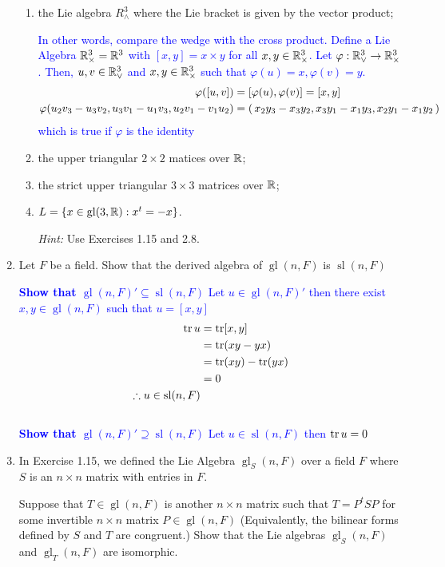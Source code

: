 \documentclass[12pt,a4paper]{report}
\newcommand{\BLUE}[1]{\textcolor{blue}{#1}}
\newcommand{\GL}{\operatorname{gl}}
\newcommand{\SL}{\operatorname{sl}}
\begin{document}
\begin{enumerate}[label=2.\arabic*]
\begin{enumerate}[label=(\roman*)]
	\item the Lie algebra $R_\wedge^3$ where the Lie bracket is given by the vector product;
	
	\BLUE{In other words, compare the wedge with the cross product.  Define a Lie Algebra $\mathbb{R}^3_\times = \mathbb{R}^3$ with $[x,y] = x \times y$ for all $x,y\in \mathbb{R}^3_\times$.  Let $\varphi: \mathbb{R}^3_\vee \to \mathbb{R}^3_\times$.  Then, $u,v \in \mathbb{R}^3_\vee$ and $x,y \in \mathbb{R}^3_\times$ such that $\varphi(u)=x, \varphi(v)=y$.
	\begin{align*}
		\varphi([u,v]) &= [\varphi(u),\varphi(v)] =[x,y] \\
		\varphi(u_2v_3-u_3v_2, u_3v_1-u_1v_3, u_2v_1-v_1u_2) &= \left (\, x_2y_3-x_3y_2, x_3y_1-x_1y_3, x_2y_1-x_1y_2  \,\right )
\end{align*}	which is true if $\varphi$ is the identity
	}
	
	\item the upper triangular $2 \times 2$ matices over $\mathbb{R}$;
	
	\item the strict upper triangular $3 \times 3$ matrices over $\mathbb{R}$;
	
	\item $L=\{ x \in \GL(3,\R):x^t=-x\}$.
	
	\textit{Hint:} Use Exercises 1.15 and 2.8.

\end{enumerate}

\item Let $F$ be a field.  Show that the derived algebra of $\GL(n,F)$ is $\SL(n,F)$

\BLUE{\textbf{Show that $\GL(n,F)' \subseteq \SL(n,F)$} Let $u \in \GL(n,F)'$ then there exist $x,y \in \GL(n,F)$ such that $u =[x,y]$ \begin{align*}
	\TR u &= \TR [x,y] \\
	&= \TR(xy - yx) \\
	&= \TR(xy)-\TR(yx) \\
	&= 0 \\
	\therefore u \in \SL(n,F)
\end{align*}\\
\textbf{Show that $\GL(n,F)'\supseteq\SL(n,F)$} Let $u \in \SL(n, F)$ then $\operatorname{tr} u=0$
}

\item In Exercise 1.15, we defined the Lie Algebra $\GL_S(n,F)$ over a field $F$ where $S$ is an $n\times n$ matrix with entries in $F$.

Suppose that $T \in \GL(n,F)$ is another $n\times n$ matrix such that $T=P^tSP$ for some invertible $n\times n$ matrix $P\in \GL(n,F)$  (Equivalently, the bilinear forms defined by $S$ and $T$ are congruent.)  Show that the Lie algebras $\GL_S(n,F)$ and $\GL_T(n,F)$ are isomorphic.


\end{enumerate}
\end{document}
